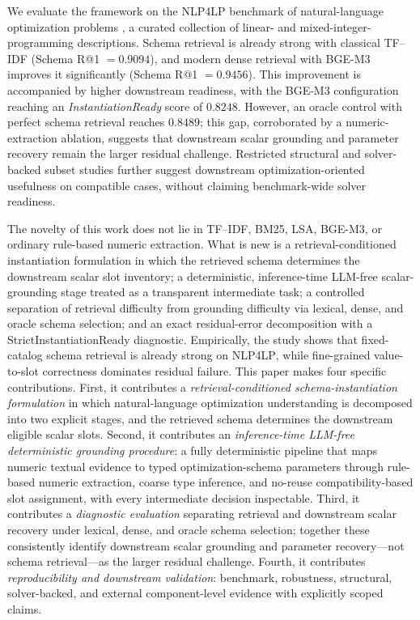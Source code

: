 \documentclass[pdflatex,sn-basic,Numbered]{sn-jnl}
\begin{document}
We evaluate the framework on the \textsc{NLP4LP} benchmark of natural-language optimization problems \cite{nlp4lp_dataset,ahmaditeshnizi2024optimus_icml}, a curated collection of linear- and mixed-integer-programming descriptions. Schema retrieval is already strong with classical TF--IDF (Schema R@1 $=0.9094$), and modern dense retrieval with BGE-M3 improves it significantly (Schema R@1 $=0.9456$). This improvement is accompanied by higher downstream readiness, with the BGE-M3 configuration reaching an \textit{InstantiationReady} score of $0.8248$. However, an oracle control with perfect schema retrieval reaches $0.8489$; this gap, corroborated by a numeric-extraction ablation, suggests that downstream scalar grounding and parameter recovery remain the larger residual challenge. Restricted structural and solver-backed subset studies further suggest downstream optimization-oriented usefulness on compatible cases, without claiming benchmark-wide solver readiness.

The novelty of this work does not lie in TF--IDF, BM25, LSA, BGE-M3, or ordinary rule-based numeric extraction. What is new is a retrieval-conditioned instantiation formulation in which the retrieved schema determines the downstream scalar slot inventory; a deterministic, inference-time LLM-free scalar-grounding stage treated as a transparent intermediate task; a controlled separation of retrieval difficulty from grounding difficulty via lexical, dense, and oracle schema selection; and an exact residual-error decomposition with a StrictInstantiationReady diagnostic. Empirically, the study shows that fixed-catalog schema retrieval is already strong on \textsc{NLP4LP}, while fine-grained value-to-slot correctness dominates residual failure. This paper makes four specific contributions.
\label{subsec:intro_contributions}
First, it contributes a \emph{retrieval-conditioned schema-instantiation formulation} in which natural-language optimization understanding is decomposed into two explicit stages, and the retrieved schema determines the downstream eligible scalar slots. Second, it contributes an \emph{inference-time LLM-free deterministic grounding procedure}: a fully deterministic pipeline that maps numeric textual evidence to typed optimization-schema parameters through rule-based numeric extraction, coarse type inference, and no-reuse compatibility-based slot assignment, with every intermediate decision inspectable. Third, it contributes a \emph{diagnostic evaluation} separating retrieval and downstream scalar recovery under lexical, dense, and oracle schema selection; together these consistently identify downstream scalar grounding and parameter recovery---not schema retrieval---as the larger residual challenge. Fourth, it contributes \emph{reproducibility and downstream validation}: benchmark, robustness, structural, solver-backed, and external component-level evidence with explicitly scoped claims.
\end{document}
